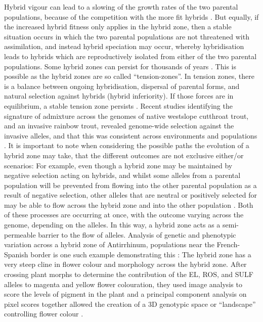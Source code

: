 Hybrid vigour can lead to a slowing of the growth rates of the two parental populations, because of the competition with the more fit hybrids \parencite{Slattery2008}.
But equally, if the increased hybrid fitness only applies in the hybrid zone, then a stable situation occurs in which the two parental populations are not threatened with assimilation, and instead hybrid speciation may occur, whereby hybridisation leads to hybrids which are reproductively isolated from either of the two parental populations.
Some hybrid zones can persist for thousands of years \parencite{White1966}.
This is possible as the hybrid zones are so called “tension-zones”.
In tension zones, there is a balance between ongoing hybridisation, dispersal of parental forms, and natural selection against hybrids (hybrid inferiority).
If those forces are in equilibrium, a stable tension zone persists \parencite{Bazykin1969}.
Recent studies identifying the signature of admixture across the genomes of native westslope cutthroat trout, and an invasive rainbow trout, revealed genome-wide selection against the invasive alleles, and that this was consistent across environments and populations \parencite{Kovach2016}.
It is important to note when considering the possible paths the evolution of a hybrid zone may take, that the different outcomes are not exclusive either/or scenarios:
For example, even though a hybrid zone may be maintained by negative selection acting on hybrids, and whilst some alleles from a parental population will be prevented from flowing into the other parental population as a result of negative selection, other alleles that are neutral or positively selected for may be able to flow across the hybrid zone and into the other population \parencite{Hewitt1985}.
Both of these processes are occurring at once, with the outcome varying across the genome, depending on the alleles.
In this way, a hybrid zone acts as a semi-permeable barrier to the flow of alleles.
Analysis of genetic and phenotypic variation across a hybrid zone of Antirrhinum, populations near the French-Spanish border is one such example demonstrating this \parencite{Whibley2006}:
The hybrid zone has a very steep cline in flower colour and morphology across the hybrid zone.
After crossing plant morphs to determine the contribution of the EL, ROS, and SULF alleles to magenta and yellow flower colouration, they used image analysis to score the levels of pigment in the plant and a principal component analysis on pixel scores together allowed the creation of a 3D genotypic space or “landscape” controlling flower colour \parencite{Whibley2006}.
